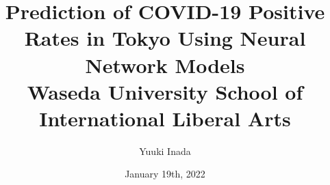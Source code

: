 \documentclass[twoside, a4paper, 11pt]{article}
\title{
{Prediction of COVID-19 Positive Rates in
Tokyo Using Neural Network Models}\\
{\large Waseda University School of International Liberal Arts}
}
\author{Yuuki Inada}
\date{January 19th, 2022}
\newcommand\blankpage{%
    \null
    \thispagestyle{empty}%
    \newpage}
\numberwithin{equation}{section}
\numberwithin{figure}{section}
\numberwithin{table}{section}
\begin{document}
\begin{titlepage}
\maketitle
\thispagestyle{empty}
\afterpage{\blankpage}
\end{titlepage}


\begin{abstract}

\end{abstract}
\clearpage


\clearpage

\clearpage
\tableofcontents
\clearpage
\listoffigures
\clearpage
\afterpage{\blankpage}

\listoftables
\clearpage


\clearpage


\clearpage


\clearpage

%


\clearpage



\clearpage

\appendix

\end{document}
